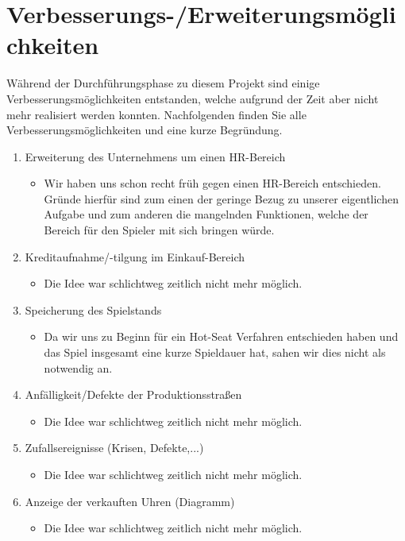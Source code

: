 \clearpage
\chapter{Verbesserungs-/Erweiterungsmöglichkeiten}
Während der Durchführungsphase zu diesem Projekt sind einige Verbesserungsmöglichkeiten entstanden, welche aufgrund der Zeit aber nicht mehr realisiert werden konnten. Nachfolgenden finden Sie alle Verbesserungsmöglichkeiten und eine kurze Begründung.
\begin{enumerate}
	\item Erweiterung des Unternehmens um einen HR-Bereich
\begin{itemize}
	\item Wir haben uns schon recht früh gegen einen HR-Bereich entschieden. Gründe hierfür sind zum einen der geringe Bezug zu unserer eigentlichen Aufgabe und zum anderen die mangelnden Funktionen, welche der Bereich für den Spieler mit sich bringen würde. 	
\end{itemize} 
	\item Kreditaufnahme/-tilgung im Einkauf-Bereich
\begin{itemize}
	\item Die Idee war schlichtweg zeitlich nicht mehr möglich.
\end{itemize} 
	\item Speicherung des Spielstands
\begin{itemize}
	\item Da wir uns zu Beginn für ein Hot-Seat Verfahren entschieden haben und das Spiel insgesamt eine kurze Spieldauer hat, sahen wir dies nicht als notwendig an.
\end{itemize} 
	\item Anfälligkeit/Defekte der Produktionsstraßen
\begin{itemize}
	\item Die Idee war schlichtweg zeitlich nicht mehr möglich.
\end{itemize} 
	\item Zufallsereignisse (Krisen, Defekte,...)
\begin{itemize}
	\item Die Idee war schlichtweg zeitlich nicht mehr möglich.
\end{itemize} 
	\item Anzeige der verkauften Uhren (Diagramm) 
\begin{itemize}
	\item Die Idee war schlichtweg zeitlich nicht mehr möglich.
\end{itemize} 	
\end{enumerate}





